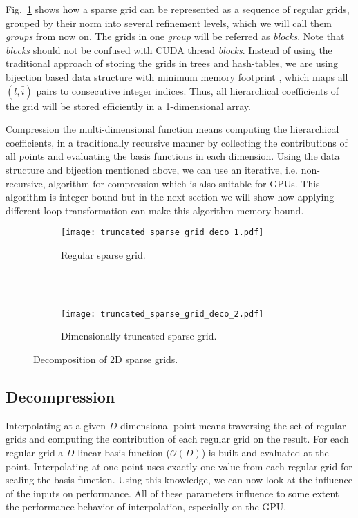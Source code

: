 Fig.~\ref{fig:truncated_sparse_grid_deco_1} shows how a sparse grid can be
represented as a sequence of regular grids, grouped by their norm into several
refinement levels, which we will call them \textit{groups} from now on. The grids
in one \textit{group} will be referred as \textit{blocks}. Note that \textit{blocks} should not be confused 
with CUDA thread \textit{blocks}. Instead of using the
traditional approach of storing the grids in trees and hash-tables, we are using
bijection based data structure with minimum memory footprint
\cite{Murarasu:2011:CDS:1941553.1941559}, which maps all $(\bar{l},\bar{i})$
pairs to consecutive integer indices. Thus, all hierarchical coefficients of the
grid will be stored efficiently in a 1-dimensional array.

Compression the multi-dimensional function means computing the hierarchical
coefficients, in a traditionally recursive manner by collecting the
contributions of all points and evaluating the basis functions in each
dimension. Using the data structure and bijection mentioned above, we can use an
iterative, i.e. non-recursive, algorithm for compression which is also suitable for
GPUs. This algorithm is integer-bound but in the next section we will show how applying
different loop transformation can make this algorithm memory bound.

\begin{figure}[t]
  \begin{subfigure}[b]{1\linewidth}
    \centering
    \texttt{[image: truncated\_sparse\_grid\_deco\_1.pdf]}
    \caption{Regular sparse grid.}
    \label{fig:truncated_sparse_grid_deco_1}
  \end{subfigure}
  \\ \\
  \begin{subfigure}[b]{1\linewidth}
    \centering
    \texttt{[image: truncated\_sparse\_grid\_deco\_2.pdf]}
    \caption{Dimensionally truncated sparse grid.}
    \label{fig:truncated_sparse_grid_deco_2}
  \end{subfigure}
  \caption{Decomposition of 2D sparse grids.}
  \label{fig:truncated_sparse_grid_deco}
\end{figure}

\subsection{Decompression}

Interpolating at a given $D$-dimensional point means traversing the set of
regular grids and computing the contribution of each regular grid on the result. For
each regular grid a $D$-linear basis function ($\mathcal{O}(D)$) is built and
evaluated at the point. Interpolating at one point uses exactly one value from each
regular grid for scaling the basis function. Using this knowledge, we can now
look at the influence of the inputs on performance. All of these parameters
influence to some extent the performance behavior of interpolation, especially
on the GPU.

